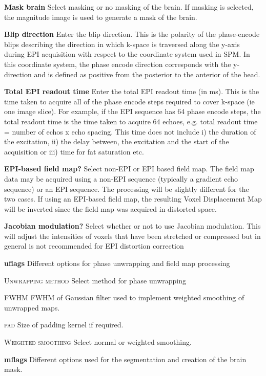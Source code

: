 \textbf{Mask brain}
Select masking or no masking of the brain. If masking is selected, the magnitude image is used to generate a mask of the brain.


\textbf{Blip direction}
Enter the blip direction. This is the polarity of the phase-encode blips describing the direction in which k-space is traversed along the y-axis during EPI acquisition with respect to the coordinate system used in SPM. In this coordinate system, the phase encode direction corresponds with the y-direction and is defined as positive from the posterior to the anterior of the head.


\textbf{Total EPI readout time}
Enter the total EPI readout time (in ms). This is the time taken to acquire all of the phase encode steps required to cover k-space (ie one image slice). For example, if the EPI sequence has 64 phase encode steps, the total readout time is the time taken to acquire 64 echoes, e.g. total readout time = number of echos x echo spacing. This time does not include i) the duration of the excitation, ii) the delay between, the excitation and the start of the acquisition or iii) time for fat saturation etc.


\textbf{EPI-based field map?}
Select non-EPI or EPI based field map. The field map data may be acquired using a non-EPI sequence (typically a gradient echo sequence) or an EPI sequence. The processing will be slightly different for the two cases. If using an EPI-based ﬁeld map, the resulting Voxel Displacement Map will be inverted since the field map was acquired in distorted space.


\textbf{Jacobian modulation?}
Select whether or not to use Jacobian modulation. This will adjust the intensities of voxels that have been stretched or compressed but in general is not recommended for EPI distortion correction


\textbf{uflags}
Different options for phase unwrapping and field map processing


\textsc{Unwrapping method}
Select method for phase unwrapping


\textsc{FWHM}
FWHM of Gaussian filter used to implement weighted smoothing of unwrapped maps.


\textsc{pad}
Size of padding kernel if required.


\textsc{Weighted smoothing}
Select normal or weighted smoothing.


\textbf{mflags}
Different options used for the segmentation and creation of the brain mask.


